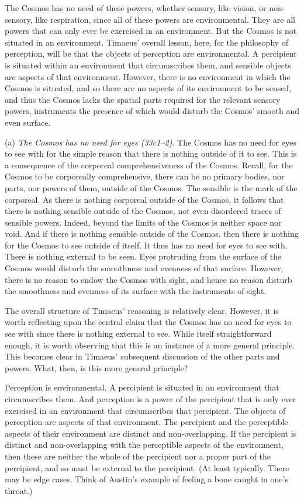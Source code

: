 The Cosmos has no need of these powers, whether sensory, like vision, or non-sensory, like respiration, since all of these powers are environmental. They are all powers that can only ever be exercised in an environment. But the Cosmos is not situated in an environment. Timaeus' overall lesson, here, for the philosophy of perception, will be that the objects of perception are environmental. A percipient is situated within an environment that circumscribes them, and sensible objects are aspects of that environment. However, there is no environment in which the Cosmos is situated, and so there are no aspects of its environment to be sensed, and thus the Cosmos lacks the spatial parts required for the relevant sensory powers, instruments the presence of which would disturb the Cosmos' smooth and even surface.

(a) \emph{The Cosmos has no need for eyes (33c1--2)}. The Cosmos has no need for eyes to see with for the simple reason that there is nothing outside of it to see. This is a consequence of the corporeal comprehensiveness of the Cosmos. Recall, for the Cosmos to be corporeally comprehensive, there can be no primary bodies, nor parts, nor powers of them, outside of the Cosmos. The sensible is the mark of the corporeal. As there is nothing corporeal outside of the Cosmos, it follows that there is nothing sensible outside of the Cosmos, not even disordered traces of sensible powers. Indeed, beyond the limits of the Cosmos is neither space nor void. And if there is nothing sensible outside of the Cosmos, then there is nothing for the Cosmos to see outside of itself. It thus has no need for eyes to see with. There is nothing external to be seen. Eyes protruding from the surface of the Cosmos would disturb the smoothness and evenness of that surface. However, there is no reason to endow the Cosmos with sight, and hence no reason disturb the smoothness and evenness of its surface with the instruments of sight.

The overall structure of Timaeus' reasoning is relatively clear. However, it is worth reflecting upon the central claim that the Cosmos has no need for eyes to see with since there is nothing external to see. While itself straightforward enough, it is worth observing that this is an instance of a more general principle. This becomes clear in Timaeus' subsequent discussion of the other parts and powers. What, then, is this more general principle?

Perception is environmental. A percipient is situated in an environment that circumscribes them. And perception is a power of the percipient that is only ever exercised in an environment that circumscribes that percipient. The objects of perception are aspects of that environment. The percipient and the perceptible aspects of their environment are distinct and non-overlapping. If the percipient is distinct and non-overlapping with the perceptible aspects of the environment, then these are neither the whole of the percipient nor a proper part of the percipient, and so must be external to the percipient. (At least typically. There may be edge cases. Think of Austin's example of feeling a bone caught in one's throat.)

